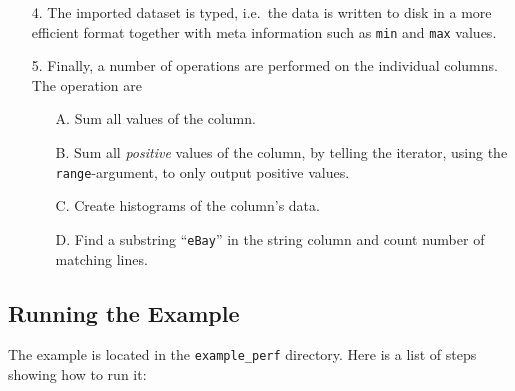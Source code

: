 \documentclass[a4paper]{article}
\begin{document}
\begin{enumerate}
  \item[4.] The imported dataset is typed, i.e.\ the data is written
    to disk in a more efficient format together with meta information
    such as \texttt{min} and \texttt{max} values.
    
  \item[5.]  Finally, a number of operations are performed on the
    individual columns.  The operation are
    \begin{itemize}
    \item[A.] Sum all values of the column.
    \item[B.] Sum all \textsl{positive} values of the column, by
      telling the iterator, using the \texttt{range}-argument, to only
      output positive values.
    \item[C.] Create histograms of the column's data.
    \item[D.] Find a substring ``\texttt{eBay}'' in the string column
      and count number of matching lines.

    \end{itemize}

\end{enumerate}


\subsection*{Running the Example}
The example is located in the \texttt{example\_perf} directory.  Here
is a list of steps showing how to run it:
\end{document}
